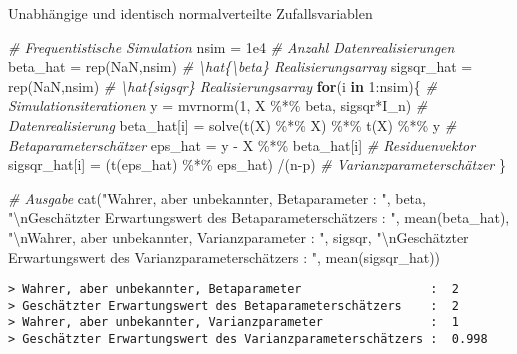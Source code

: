 \documentclass[
  8pt,
  ignorenonframetext,
]{beamer}
\newenvironment{Shaded}{\begin{snugshade}}{\end{snugshade}}
\newcommand{\CommentTok}[1]{\textcolor[rgb]{0.56,0.35,0.01}{\textit{#1}}}
\newcommand{\ConstantTok}[1]{\textcolor[rgb]{0.00,0.00,0.00}{#1}}
\newcommand{\ControlFlowTok}[1]{\textcolor[rgb]{0.13,0.29,0.53}{\textbf{#1}}}
\newcommand{\DecValTok}[1]{\textcolor[rgb]{0.00,0.00,0.81}{#1}}
\newcommand{\FloatTok}[1]{\textcolor[rgb]{0.00,0.00,0.81}{#1}}
\newcommand{\FunctionTok}[1]{\textcolor[rgb]{0.00,0.00,0.00}{#1}}
\newcommand{\NormalTok}[1]{#1}
\newcommand{\OtherTok}[1]{\textcolor[rgb]{0.56,0.35,0.01}{#1}}
\newcommand{\SpecialCharTok}[1]{\textcolor[rgb]{0.00,0.00,0.00}{#1}}
\newcommand{\StringTok}[1]{\textcolor[rgb]{0.31,0.60,0.02}{#1}}
\begin{document}
\begin{frame}[fragile]{Unabhängige und identisch normalverteilte
Zufallsvariablen}
\begin{Shaded}
\begin{Highlighting}[]
\CommentTok{\# Frequentistische Simulation}
\NormalTok{nsim       }\OtherTok{=} \FloatTok{1e4}                                     \CommentTok{\# Anzahl Datenrealisierungen}
\NormalTok{beta\_hat   }\OtherTok{=} \FunctionTok{rep}\NormalTok{(}\ConstantTok{NaN}\NormalTok{,nsim)                           }\CommentTok{\# \textbackslash{}hat\{\textbackslash{}beta\} Realisierungsarray}
\NormalTok{sigsqr\_hat }\OtherTok{=} \FunctionTok{rep}\NormalTok{(}\ConstantTok{NaN}\NormalTok{,nsim)                           }\CommentTok{\# \textbackslash{}hat\{sigsqr\} Realisierungsarray}
\ControlFlowTok{for}\NormalTok{(i }\ControlFlowTok{in} \DecValTok{1}\SpecialCharTok{:}\NormalTok{nsim)\{                                    }\CommentTok{\# Simulationsiterationen}
\NormalTok{  y             }\OtherTok{=} \FunctionTok{mvrnorm}\NormalTok{(}\DecValTok{1}\NormalTok{, X }\SpecialCharTok{\%*\%}\NormalTok{ beta, sigsqr}\SpecialCharTok{*}\NormalTok{I\_n) }\CommentTok{\# Datenrealisierung}
\NormalTok{  beta\_hat[i]   }\OtherTok{=} \FunctionTok{solve}\NormalTok{(}\FunctionTok{t}\NormalTok{(X) }\SpecialCharTok{\%*\%}\NormalTok{ X) }\SpecialCharTok{\%*\%} \FunctionTok{t}\NormalTok{(X) }\SpecialCharTok{\%*\%}\NormalTok{ y   }\CommentTok{\# Betaparameterschätzer}
\NormalTok{  eps\_hat       }\OtherTok{=}\NormalTok{ y }\SpecialCharTok{{-}}\NormalTok{ X }\SpecialCharTok{\%*\%}\NormalTok{ beta\_hat[i]              }\CommentTok{\# Residuenvektor}
\NormalTok{  sigsqr\_hat[i] }\OtherTok{=}\NormalTok{ (}\FunctionTok{t}\NormalTok{(eps\_hat) }\SpecialCharTok{\%*\%}\NormalTok{ eps\_hat) }\SpecialCharTok{/}\NormalTok{(n}\SpecialCharTok{{-}}\NormalTok{p)    }\CommentTok{\# Varianzparameterschätzer}
\NormalTok{\}}

\CommentTok{\# Ausgabe}
\FunctionTok{cat}\NormalTok{(}\StringTok{"Wahrer, aber unbekannter, Betaparameter                  : "}\NormalTok{, beta,}
    \StringTok{"}\SpecialCharTok{\textbackslash{}n}\StringTok{Geschätzter Erwartungswert des Betaparameterschätzers    : "}\NormalTok{, }\FunctionTok{mean}\NormalTok{(beta\_hat),}
    \StringTok{"}\SpecialCharTok{\textbackslash{}n}\StringTok{Wahrer, aber unbekannter, Varianzparameter               : "}\NormalTok{, sigsqr,}
    \StringTok{"}\SpecialCharTok{\textbackslash{}n}\StringTok{Geschätzter Erwartungswert des Varianzparameterschätzers : "}\NormalTok{, }\FunctionTok{mean}\NormalTok{(sigsqr\_hat))}
\end{Highlighting}
\end{Shaded}

\begin{verbatim}
> Wahrer, aber unbekannter, Betaparameter                  :  2 
> Geschätzter Erwartungswert des Betaparameterschätzers    :  2 
> Wahrer, aber unbekannter, Varianzparameter               :  1 
> Geschätzter Erwartungswert des Varianzparameterschätzers :  0.998
\end{verbatim}
\end{frame}
\end{document}
